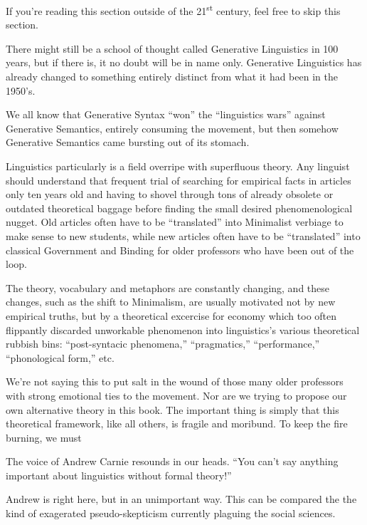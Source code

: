\documentclass{book}
\begin{document}
If you're reading this section outside of the 21\textsuperscript{st} century, feel free to skip this section.

There might still be a school of thought called Generative Linguistics in 100 years, but if there is, it no doubt will be in name only. Generative Linguistics has already changed to something entirely distinct from what it had been in the 1950's.

We all know that Generative Syntax ``won'' the ``linguistics wars'' against Generative Semantics, entirely consuming the movement, but then somehow Generative Semantics came bursting out of its stomach.

Linguistics particularly is a field overripe with superfluous theory. Any linguist should understand that frequent trial of searching for empirical facts in articles only ten years old and having to shovel through tons of already obsolete or outdated theoretical baggage before finding the small desired phenomenological nugget. Old articles often have to be ``translated'' into Minimalist verbiage to make sense to new students, while new articles often have to be ``translated'' into classical Government and Binding for older professors who have been out of the loop.

The theory, vocabulary and metaphors are constantly changing, and these changes, such as the shift to Minimalism, are usually motivated not by new empirical truths, but by a theoretical excercise for economy which too often flippantly discarded unworkable phenomenon into linguistics's various theoretical rubbish bins: ``post-syntacic phenomena,'' ``pragmatics,'' ``performance,'' ``phonological form,'' etc.



We're not saying this to put salt in the wound of those many older professors with strong emotional ties to the movement. Nor are we trying to propose our own alternative theory in this book. The important thing is simply that this theoretical framework, like all others, is fragile and moribund. To keep the fire burning, we must 





The voice of Andrew Carnie resounds in our heads. ``You can't say anything important about linguistics without formal theory!''

Andrew is right here, but in an unimportant way. This can be compared the the kind of exagerated pseudo-skepticism currently plaguing the social sciences. 
\end{document}
